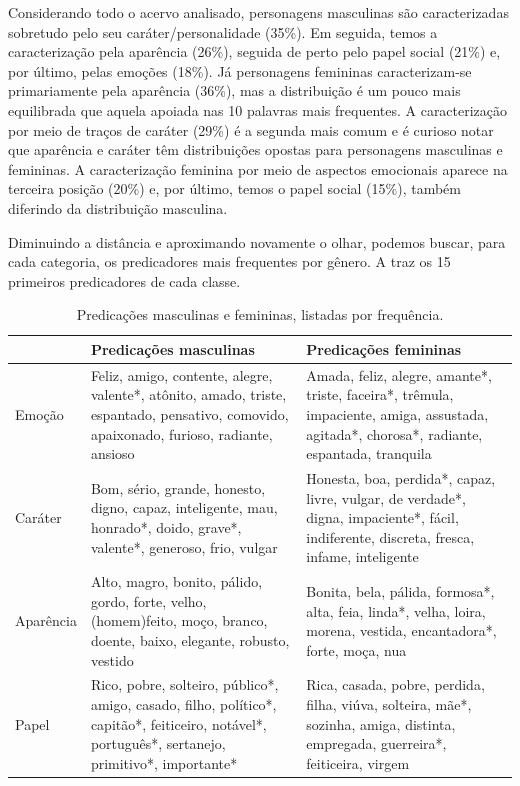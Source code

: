 \documentclass[portuguese]{textolivre}
\begin{document}
Considerando todo o acervo analisado, personagens masculinas são caracterizadas sobretudo pelo seu caráter/personalidade (35\%). Em seguida, temos a caracterização pela aparência (26\%), seguida de perto pelo papel social (21\%) e, por último, pelas emoções (18\%). Já personagens femininas caracterizam-se primariamente pela aparência (36\%), mas a distribuição é um pouco mais equilibrada que aquela apoiada nas 10 palavras mais frequentes. A caracterização por meio de traços de caráter (29\%) é a segunda mais comum e é curioso notar que aparência e caráter têm distribuições opostas para personagens masculinas e femininas. A caracterização feminina por meio de aspectos emocionais aparece na terceira posição (20\%) e, por último, temos o papel social (15\%), também diferindo da distribuição masculina.

Diminuindo a distância e aproximando novamente o olhar, podemos buscar, para cada categoria, os predicadores mais frequentes por gênero. A  traz os 15 primeiros predicadores de cada classe.

\begin{table}[htbp]
\caption{Predicações masculinas e femininas, listadas por frequência.}
\label{tbl3}
\centering
\begin{tabular}{lp{5.75cm}p{5.75cm}}
\toprule
 & Predicações masculinas & Predicações femininas \\ \midrule
Emoção & 
Feliz, amigo, contente, alegre, valente*, atônito, amado, triste, espantado, pensativo, comovido, apaixonado, furioso, radiante, ansioso & 
Amada, feliz, alegre, amante*, triste, faceira*, trêmula, impaciente, amiga, assustada, agitada*, chorosa*, radiante, espantada, tranquila \\
Caráter & 
Bom, sério, grande, honesto, digno, capaz, inteligente, mau, honrado*, doido, grave*, valente*, generoso, frio, vulgar & 
Honesta, boa, perdida*, capaz, livre, vulgar, de verdade*, digna, impaciente*, fácil, indiferente, discreta, fresca, infame, inteligente \\
Aparência & 
Alto, magro, bonito, pálido, gordo, forte, velho, (homem)feito, moço, branco, doente, baixo, elegante, robusto, vestido &
Bonita, bela, pálida, formosa*, alta, feia, linda*, velha, loira, morena, vestida, encantadora*, forte, moça, nua \\
Papel & 
Rico, pobre, solteiro, público*, amigo, casado, filho, político*, capitão*, feiticeiro, notável*, português*, sertanejo, primitivo*, importante* &
Rica, casada, pobre, perdida, filha, viúva, solteira, mãe*, sozinha, amiga, distinta, empregada, guerreira*, feiticeira, virgem \\
\bottomrule
\end{tabular}
\end{table}
\end{document}
